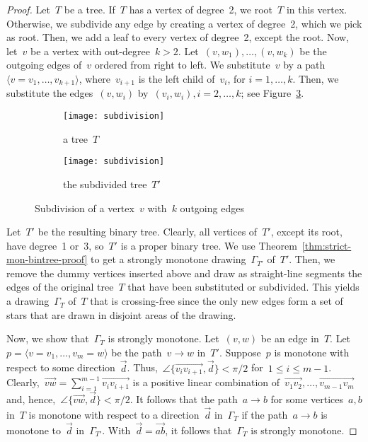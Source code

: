 \documentclass[a4paper,11pt]{article}
\theoremstyle{plain}
\begin{document}
\begin{proof}
  Let~$T$ be a tree. If~$T$ has a vertex of degree~2, we root~$T$ in this 
  vertex. Otherwise, we subdivide any edge by creating a vertex of degree~2, 
  which we pick as root. Then, we add a leaf to every vertex of degree~2, 
  except the root. Now, let~$v$ be a vertex with out-degree~$k>2$. 
  Let~$(v,w_1),\dots,(v,w_k)$ be the outgoing edges of~$v$ ordered from right to 
  left. We substitute~$v$ by a path~$\langle v=v_1,\dots,v_{k+1}\rangle$, 
  where~$v_{i+1}$ is the left child of~$v_i$, for $i=1,\dots,k$. Then, we 
  substitute the edges~$(v,w_i)$ by~$(v_i,w_i),i=2,\dots,k$; see 
  Figure~\ref{fig:subdivision}.
  
  \begin{figure}[tb]
    \hfill
    \begin{subfigure}[b]{.45\textwidth}
      \centering
      \texttt{[image: subdivision]}
      \caption{a tree~$T$}
      \label{fig:subdivision-1}
    \end{subfigure}
    \hfill
    \begin{subfigure}[b]{.45\textwidth}
      \centering
      \texttt{[image: subdivision]}
      \caption{the subdivided tree~$T'$}
      \label{fig:subdivision-2}
    \end{subfigure}
    \hfill
    \caption{Subdivision of a vertex~$v$ with~$k$ outgoing edges}
    \label{fig:subdivision}
  \end{figure}
   
  Let~$T'$ be the resulting binary tree.  Clearly, all vertices of~$T'$, 
  except its root, have degree~1 or~3, so~$T'$ is a proper binary tree.
  We use Theorem~\ref{thm:strict-mon-bintree-proof} to get a strongly monotone
  drawing~$\Gamma_{T'}$ of~$T'$. Then, we remove the dummy vertices inserted
  above and draw as straight-line segments the edges of the original
  tree~$T$ that have been substituted or subdivided.
  This yields a drawing~$\Gamma_T$ of~$T$ that is crossing-free
  since the only new edges form a set of stars that are drawn in disjoint
  areas of the drawing.
  
  Now, we show that~$\Gamma_T$ is strongly monotone. Let~$(v,w)$ be an edge
  in~$T$. Let~$p=\langle v=v_1,\dots,v_m=w\rangle$ be the path~$v\to w$ in~$T'$.
  Suppose~$p$ is monotone with respect to some direction~$\vec d$. 
  Thus,~$\angle\{\overrightarrow{v_iv_{i+1}},\vec d\}<\pi/2$ 
  for~$1\le i\le m-1$. 
  Clearly,~$\overrightarrow{vw}=\sum_{i=1}^{m-1}\overrightarrow{v_iv_{i+1}}$
  is a positive linear combination
  of~$\overrightarrow{v_1v_2},\dots,\overrightarrow{v_{m-1}v_m}$
  and, hence,~$\angle\{\overrightarrow{vw},\vec d\}<\pi/2$.
  It follows that the path~$a\to b$ for some vertices~$a,b$ in~$T$ is monotone
  with respect to a direction~$\vec d$ in~$\Gamma_T$ if the path~$a\to b$ is
  monotone to~$\vec d$ in~$\Gamma_{T'}$. With~$\vec d=\overrightarrow{ab}$, 
  it follows that~$\Gamma_T$ is strongly monotone.
\end{proof}
\end{document}
